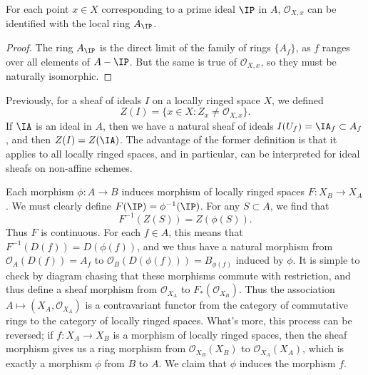 \begin{theorem}
    For each point $x \in X$ corresponding to a prime ideal $\IP$ in $A$, $\mathcal{O}_{X,x}$ can be identified with the local ring $A_{\IP}$.
\end{theorem}
\begin{proof}
    The ring $A_{\IP}$ is the direct limit of the family of rings $\{ A_f \}$, as $f$ ranges over all elements of $A - \IP$. But the same is true of $\mathcal{O}_{X,x}$, so they must be naturally isomorphic.
\end{proof}

\begin{remark}
    Previously, for a sheaf of ideals $I$ on a locally ringed space $X$, we defined
    \[ Z(I) = \{ x \in X: Z_x \neq \mathcal{O}_{X,x} \}. \]
    If $\IA$ is an ideal in $A$, then we have a natural sheaf of ideals $I(U_f) = \IA_f \subset A_f$, and then $Z(I) = Z(\IA)$. The advantage of the former definition is that it applies to all locally ringed spaces, and in particular, can be interpreted for ideal sheafs on non-affine schemes.
\end{remark}

Each morphism $\phi: A \to B$ induces morphism of locally ringed spaces $F: X_B \to X_A$. We must clearly define $F(\IP) = \phi^{-1}(\IP)$. For any $S \subset A$, we find that
%
\[ F^{-1}(Z(S)) = Z(\phi(S)). \]
%
Thus $F$ is continuous. For each $f \in A$, this means that $F^{-1}(D(f)) = D(\phi(f))$, and we thus have a natural morphism from $\mathcal{O}_A(D(f)) = A_f$ to $\mathcal{O}_B(D(\phi(f))) = B_{\phi(f)}$ induced by $\phi$. It is simple to check by diagram chasing that these morphisms commute with restriction, and thus define a sheaf morphism from $\mathcal{O}_{X_A}$ to $F_*(\mathcal{O}_{X_B})$. Thus the association $A \mapsto (X_A, \mathcal{O}_{X_A})$ is a contravariant functor from the category of commutative rings to the category of locally ringed spaces. What's more, this process can be reversed; if $f: X_A \to X_B$ is a morphism of locally ringed spaces, then the sheaf morphism gives us a ring morphism from $\mathcal{O}_{X_B}(X_B) $ to $\mathcal{O}_{X_A}(X_A)$, which is exactly a morphism $\phi$ from $B$ to $A$. We claim that $\phi$ induces the morphism $f$.


